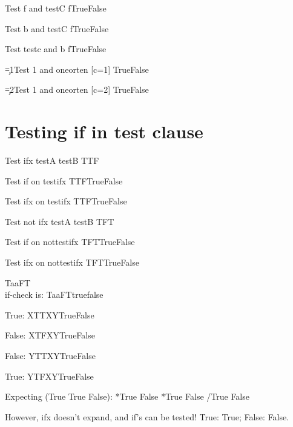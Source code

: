 \documentclass{article}
\begin{document}
Test f and testC \if f\testC True\else False\fi

Test b and testC \if f\testC True\else False\fi

Test testc and b  \if f\testC True\else False\fi

\c=1\relax Test 1 and oneorten [c=1]  \oneorten True\else False\fi

\c=2\relax Test 1 and oneorten [c=2]  \oneorten True\else False\fi

\section{Testing if in test clause}
\def\testifx{T\ifx\testA\testB T\else F\fi}

Test ifx testA testB \testifx

Test if on testifx \if\testifx True\else False\fi

Test ifx on testifx \if\testifx True\else False\fi

\def\nottestifx{T\ifx\testA\testB F\else T\fi}

Test not ifx testA testB \nottestifx

Test if on nottestifx \if\nottestifx True\else False\fi

Test ifx on nottestifx \ifx\nottestifx True\else False\fi


\def\a{a}%
 \let\b=\a
 \def\check{T\ifx\a\b F\else T\fi}

 \check\\

 if-check is: \if\check true\else false\fi


\def\innerif{\if\clause X\else Y\fi}

True: \def\clause{TT}\if X\innerif True\else False\fi

False: \def\clause{TF}\if X\innerif True\else False\fi

False: \def\clause{TT}\if Y\innerif True\else False\fi

True: \def\clause{TF}\if Y\innerif True\else False\fi

\def\a{*}
\let\b=*
\def\c{/}

Expecting (True True False):
\if*\a True \else False \fi
\if\a\b True \else False \fi
\if\a\c True \else False \fi

However, ifx doesn't expand, and if's can be tested!
True: \ifx\iftrue\iftrue True\else False\fi;
False: \ifx\iftrue\iffalse True\else False\fi.
\end{document}
